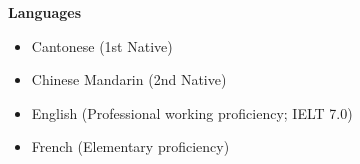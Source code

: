 \documentclass[10pt, letterpaper]{article}
\newenvironment{highlights}{
    \begin{itemize}[
        topsep=0.10 cm,
        parsep=0.10 cm,
        partopsep=0pt,
        itemsep=0pt,
        leftmargin=0.4 cm + 10pt
    ]
}{
    \end{itemize}
} %
\newenvironment{twocolentry}[2][]{
    \onecolentry
    \def\secondColumn{#2}
    \setcolumnwidth{\fill, 4.5 cm}
    \begin{paracol}{2}
}{
    \switchcolumn \raggedleft \secondColumn
    \end{paracol}
    \endonecolentry
} %
\begin{document}

\textbf{Languages}
\begin{highlights}
    \item Cantonese (1st Native)
    \item Chinese Mandarin (2nd Native)
    \item English (Professional working proficiency; IELT 7.0)
    \item French (Elementary proficiency)
\end{highlights}
\end{document}
